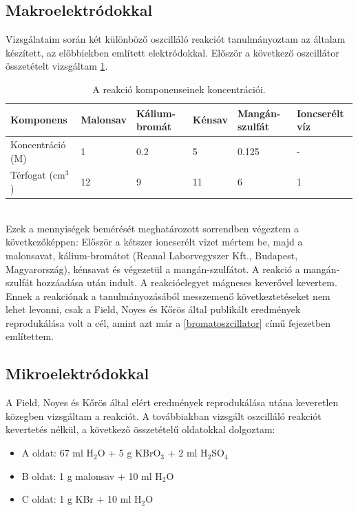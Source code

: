 \subsection{Makroelektródokkal}

Vizsgálataim során két különböző oszcilláló reakciót tanulmányoztam az általam készített, az előbbiekben említett elektródokkal. 
Először a következő oszcillátor összetételt vizsgáltam \ref{my-label}.
\begin{table}[h!]
\centering
\caption{A reakció komponenseinek koncentrációi.}
\label{my-label}
\begin{tabular}{llllll}
Komponens                       & Malonsav & Kálium-bromát & Kénsav & Mangán-szulfát & Ioncserélt víz \\
\hline
Koncentráció (M)                & 1        & 0.2           & 5      & 0.125          & -              \\
Térfogat (cm$^3$) & 12       & 9             & 11     & 6              & 1              \\
\end{tabular}
\end{table}\\
Ezek a mennyiségek bemérését meghatározott sorrendben végeztem a következőképpen: Először a kétszer ioncserélt vizet mértem be, majd a malonsavat, kálium-bromátot (Reanal Laborvegyszer Kft., Budapest, Magyarország), kénsavat és végezetül a mangán-szulfátot. A reakció a mangán-szulfát hozzáadása után indult. A reakcióelegyet mágneses keverővel kevertem. Ennek a reakciónak a tanulmányozásából messzemenő következtetéseket nem lehet levonni, csak a Field, Noyes és Kőrös által publikált eredmények reprodukálása \cite{noyes1972oscillations} volt a cél, amint azt már a \ref{bromatoszcillator} című fejezetben említettem.

\subsection{Mikroelektródokkal} \label{mikroelektrod}

A Field, Noyes és Kőrös által elért eredmények reprodukálása utána \cite{noyes1972oscillations} keveretlen közegben vizsgáltam a reakciót.
A továbbiakban vizsgált oszcilláló reakciót kevertetés nélkül, a következő összetételű oldatokkal dolgoztam: 

\begin{itemize} \label{komponensek}
\item A oldat: 67 ml H$_2$O + 5 g KBrO$_3$ + 2 ml H$_2$SO$_4$
\item B oldat: 1 g malonsav + 10 ml H$_2$O
\item C oldat: 1 g KBr + 10 ml H$_2$O
\end{itemize}


